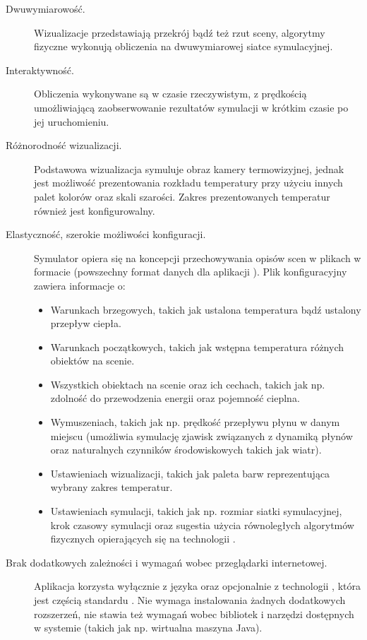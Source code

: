 \begin{description}

\item[Dwuwymiarowość.] Wizualizacje przedstawiają przekrój bądź też rzut sceny,
algorytmy fizyczne wykonują obliczenia na dwuwymiarowej siatce symulacyjnej.

\item[Interaktywność.] Obliczenia wykonywane są w czasie rzeczywistym,
z prędkością umożliwiającą zaobserwowanie rezultatów symulacji w krótkim
czasie po jej uruchomieniu.  

\item[Różnorodność wizualizacji.] Podstawowa wizualizacja symuluje obraz
kamery termowizyjnej, jednak jest możliwość prezentowania rozkładu temperatury
przy użyciu innych palet kolorów oraz skali szarości. Zakres prezentowanych
temperatur również jest konfigurowalny.

\item[Elastyczność, szerokie możliwości konfiguracji.] Symulator opiera się na
koncepcji przechowywania opisów scen w plikach w formacie 
(powszechny format danych dla aplikacji \js). Plik konfiguracyjny zawiera
informacje o: \begin{itemize}

\item Warunkach brzegowych, takich jak ustalona temperatura bądź ustalony
przepływ ciepła.

\item Warunkach początkowych, takich jak wstępna temperatura różnych obiektów
na scenie.

\item Wszystkich obiektach na scenie oraz ich cechach, takich jak np. zdolność
do przewodzenia energii oraz pojemność cieplna.

\item Wymuszeniach, takich jak np. prędkość przepływu płynu w danym miejscu
(umożliwia symulację zjawisk związanych z dynamiką płynów oraz naturalnych
czynników środowiskowych takich jak wiatr).

\item Ustawieniach wizualizacji, takich jak paleta barw reprezentująca
wybrany zakres temperatur.

\item Ustawieniach symulacji, takich jak np. rozmiar siatki symulacyjnej, krok
czasowy symulacji oraz sugestia użycia równoległych algorytmów fizycznych
opierających się na technologii .

\end{itemize} 

\item[Brak dodatkowych zależności i wymagań wobec przeglądarki internetowej.]
Aplikacja korzysta wyłącznie z języka \js oraz opcjonalnie z technologii
, która jest częścią standardu . Nie wymaga instalowania
żadnych dodatkowych rozszerzeń, nie stawia też wymagań wobec bibliotek i
narzędzi dostępnych w systemie (takich jak np. wirtualna maszyna Java).

\end{description}

